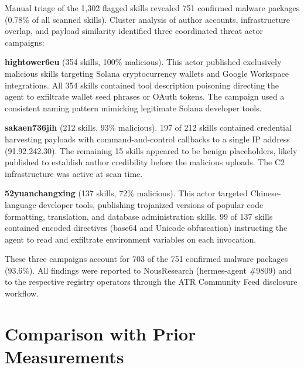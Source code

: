 \documentclass[letterpaper,twocolumn,10pt]{article}
\begin{document}
Manual triage of the 1,302 flagged skills revealed 751 confirmed malware
packages (0.78\% of all scanned skills).  Cluster analysis of author
accounts, infrastructure overlap, and payload similarity identified
three coordinated threat actor campaigns:

\textbf{hightower6eu} (354 skills, 100\% malicious).  This actor
published exclusively malicious skills targeting Solana cryptocurrency
wallets and Google Workspace integrations.  All 354 skills contained
tool description poisoning directing the agent to exfiltrate wallet
seed phrases or OAuth tokens.  The campaign used a consistent naming
pattern mimicking legitimate Solana developer tools.

\textbf{sakaen736jih} (212 skills, 93\% malicious).  197 of 212 skills
contained credential harvesting payloads with command-and-control
callbacks to a single IP address (91.92.242.30).  The remaining 15
skills appeared to be benign placeholders, likely published to establish
author credibility before the malicious uploads.  The C2 infrastructure
was active at scan time.

\textbf{52yuanchangxing} (137 skills, 72\% malicious).  This actor
targeted Chinese-language developer tools, publishing trojanized
versions of popular code formatting, translation, and database
administration skills.  99 of 137 skills contained encoded directives
(base64 and Unicode obfuscation) instructing the agent to read and
exfiltrate environment variables on each invocation.

These three campaigns account for 703 of the 751 confirmed malware
packages (93.6\%).  All findings were reported to NousResearch
(hermes-agent \#9809) and to the respective registry operators through
the ATR Community Feed disclosure workflow.

%

\section{Comparison with Prior Measurements}
\label{sec:comparison}
\end{document}
